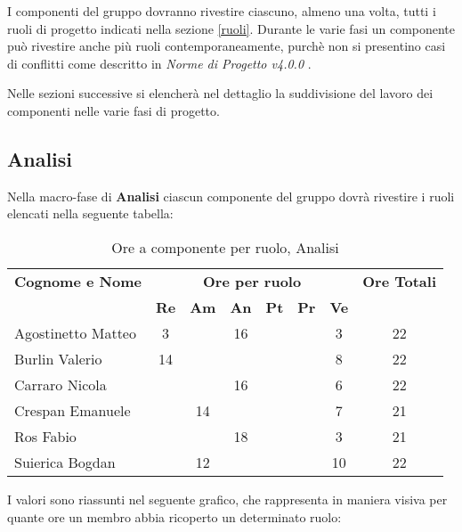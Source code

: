 I componenti del gruppo dovranno rivestire ciascuno, almeno una volta, tutti i ruoli di progetto indicati nella sezione \ref{ruoli}. Durante le varie fasi un componente può rivestire anche più ruoli contemporaneamente, purchè non si presentino casi di conflitti come descritto in \textit{Norme di Progetto v4.0.0} .

\noindent Nelle sezioni successive si elencherà nel dettaglio la suddivisione del lavoro dei componenti nelle varie fasi di progetto.

\subsection{Analisi}
Nella macro-fase di \textbf{Analisi} ciascun componente del gruppo dovrà rivestire i ruoli elencati nella seguente tabella:

\begin{table}[h]
\centering
\begin{tabular}{|l|c|c|c|c|c|c|c|}
\toprule
	\textbf{Cognome e Nome} & \multicolumn{6}{c}{\textbf{Ore per ruolo}} & \textbf{Ore Totali} \\
	& \textbf{Re} & \textbf{Am} & \textbf{An} & \textbf{Pt} & \textbf{Pr} & \textbf{Ve} & \\
	 
\midrule
	Agostinetto Matteo & 3 & & 16 & & & 3 & 22 \\
	Burlin Valerio & 14 & & & & & 8 & 22 \\ 
	Carraro Nicola & & & 16 & & & 6 & 22 \\
	Crespan Emanuele & & 14 & & & & 7 & 21 \\
	Ros Fabio & & & 18 & & & 3 & 21 \\
	Suierica Bogdan & & 12 & & & & 10 & 22 \\

\bottomrule
\end{tabular}
\caption{Ore a componente per ruolo, Analisi}
\end{table}

\noindent I valori sono riassunti nel seguente grafico, che rappresenta in maniera visiva per quante ore un membro abbia ricoperto un determinato ruolo:

